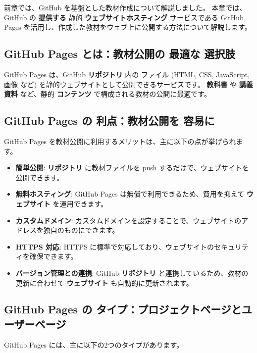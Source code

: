 
前章では、GitHub を基盤とした教材作成について解説しました。
本章では、GitHub の \textbf{提供する} 静的 \textbf{ウェブサイトホスティング} サービスである GitHub Pages を活用し、作成した教材をウェブ上に公開する方法について解説します。

\subsection{GitHub Pages とは：教材公開の \textbf{最適な} 選択肢}

GitHub Pages は、GitHub \textbf{リポジトリ} 内の ファイル (HTML, CSS, JavaScript, 画像 など) を静的ウェブサイトとして公開できるサービスです。
\textbf{教科書} や \textbf{講義資料} など、静的 \textbf{コンテンツ} で構成される教材の公開に最適です。

\subsection{GitHub Pages の \textbf{利点}：教材公開を \textbf{容易に}}

GitHub Pages を教材公開に利用するメリットは、主に以下の点が挙げられます。

\begin{itemize}
    \item \textbf{簡単公開}:  \textbf{リポジトリ} に教材ファイルを push するだけで、ウェブサイトを公開できます。
    \item \textbf{無料ホスティング}: GitHub Pages は無償で利用できるため、費用を抑えて \textbf{ウェブサイト} を運用できます。
    \item \textbf{カスタムドメイン}: カスタムドメインを設定することで、ウェブサイトのアドレスを独自のものにできます。
    \item \textbf{HTTPS 対応}: HTTPS に標準で対応しており、ウェブサイトのセキュリティを確保できます。
    \item \textbf{バージョン管理との連携}: GitHub \textbf{リポジトリ} と連携しているため、教材の更新に合わせて \textbf{ウェブサイト} も自動的に更新されます。
\end{itemize}

\subsection{GitHub Pages の タイプ：プロジェクトページとユーザーページ}

GitHub Pages には、主に以下の2つのタイプがあります。

